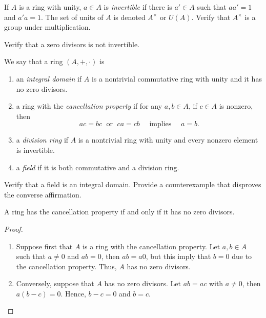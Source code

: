 \documentclass[11pt,a4paper]{article}
\begin{document}
If \(A\) is a ring with unity, \(a\in A\) is \textit{invertible} if there is \(a'\in A\) such that \(aa' = 1\) and \(a'a=1\).
The set of units of \(A\) is denoted \(A^\times \) or \(U(A)\). Verify that \(A^\times\) is a group under multiplication.

\begin{eje}
    Verify that a zero divisors is not invertible.
\end{eje}

We say that a ring $(A,+,\cdot)$
is 
\begin{enumerate}[label=(\roman*)]
\item an \textit{integral domain} if \(A\) is a nontrivial commutative ring with unity and it has no zero divisors.
\item a ring with the \textit{cancellation property} if for any \(a,b\in A\), if \(c\in A\) is nonzero, then 
\[
ac=bc \;\text{ or }\; ca = cb \quad\text{ implies }\quad a=b.
\]

\item a \textit{division ring} if \(A\) is a nontrivial ring with unity and every nonzero element is invertible.
\item a \textit{field} if it is both commutative and   a division ring. 
\end{enumerate}

\begin{eje}
    Verify that a  field is an integral domain.
    Provide a counterexample that disproves the converse affirmation.
\end{eje}

\begin{prop} 
A ring has the  cancellation property if and only if it has no zero divisors.
\end{prop} 

\begin{proof}
\begin{enumerate}[label=(\roman*)]
\item Suppose first that $A$ is a ring with the cancellation property. Let $a,b\in A$ such that $a\neq 0$ and $ab=0$, then $ab=a0$, but this imply that $b=0$ due to the cancellation property. Thus, $A$ has no zero divisors.
\item Conversely, suppose that $A$ has no zero divisors. Let $ab=ac$ with $a\neq0$, then $a(b-c)=0$. Hence, $b-c=0$ and $b=c$.
\end{enumerate}
\end{proof}
  
\end{document}
